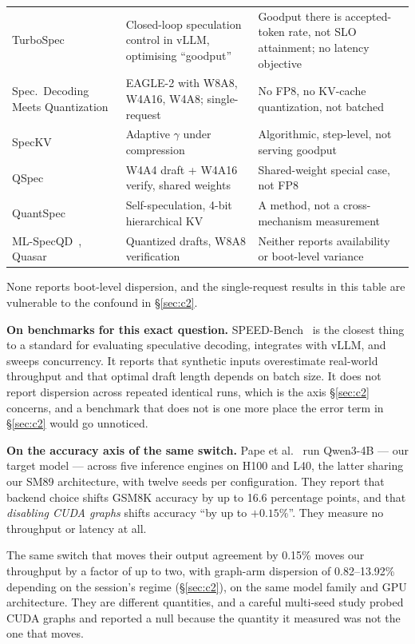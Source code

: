\documentclass[11pt]{article}
\begin{document}
\begin{table}[h]
\begin{tabular}{>{\raggedright\arraybackslash}p{}>{\raggedright\arraybackslash}p{}>{\raggedright\arraybackslash}p{}}
TurboSpec~\cite{liu2024turbospec} & Closed-loop speculation control in vLLM, optimising ``goodput'' & Goodput there is accepted-token rate, not SLO attainment; no latency objective\\
Spec.\ Decoding Meets Quantization~\cite{specquant2025} & EAGLE-2 with W8A8, W4A16, W4A8; single-request & No FP8, no KV-cache quantization, not batched\\
SpecKV~\cite{speckv2026} & Adaptive $\gamma$ under compression & Algorithmic, step-level, not serving goodput\\
QSpec~\cite{qspec2025} & W4A4 draft + W4A16 verify, shared weights & Shared-weight special case, not FP8\\
QuantSpec~\cite{quantspec2025} & Self-speculation, 4-bit hierarchical KV & A method, not a cross-mechanism measurement\\
ML-SpecQD~\cite{mlspecqd2025}, Quasar~\cite{quasar2026} & Quantized drafts, W8A8 verification & Neither reports availability or boot-level variance\\
\bottomrule
\end{tabular}
\end{table}

\noindent
None reports boot-level dispersion, and the single-request results in this
table are vulnerable to the confound in \S\ref{sec:c2}.

\textbf{On benchmarks for this exact question.}
SPEED-Bench~\cite{abramovich2026speedbench} is the closest thing to a
standard for evaluating speculative decoding, integrates with vLLM, and
sweeps concurrency. It reports that synthetic inputs overestimate real-world
throughput and that optimal draft length depends on batch size. It does not
report dispersion across repeated identical runs, which is the axis
\S\ref{sec:c2} concerns, and a benchmark that does not is one more place the
error term in \S\ref{sec:c2} would go unnoticed.

\textbf{On the accuracy axis of the same switch.}
Pape et al.~\cite{pape2026silent} run Qwen3-4B --- our target model --- across
five inference engines on H100 and L40, the latter sharing our SM89
architecture, with twelve seeds per configuration. They report that backend
choice shifts GSM8K accuracy by up to 16.6 percentage points, and that
\emph{disabling CUDA graphs} shifts accuracy ``by up to $+0.15\%$''. They
measure no throughput or latency at all.

The same switch that moves their output agreement by 0.15\% moves our
throughput by a factor of up to two, with graph-arm dispersion of
0.82--13.92\% depending on the session's regime (\S\ref{sec:c2}), on the same
model family and GPU architecture. They are different quantities, and a
careful multi-seed study probed CUDA graphs and reported a null because the
quantity it measured was not the one that moves.
\end{document}
